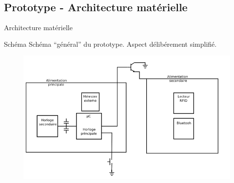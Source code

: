 \subsection{Prototype - Architecture matérielle}
\begin{frame}{Architecture matérielle}
	\begin{block}{Schéma}
        Schéma ``général'' du prototype. Aspect délibérement simplifié.
	\end{block}

    \begin{figure}[h]
        \begin{center}
            \includegraphics[scale=0.4]{images/protoSchema.png} 
        \end{center}
     \end{figure} 
\end{frame}

